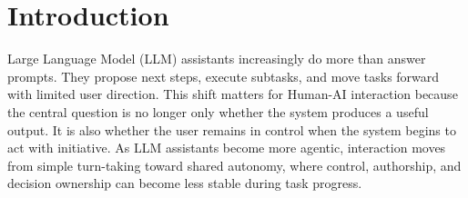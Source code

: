 \documentclass[sigconf,review,anonymous]{acmart}
\begin{document}



\maketitle

\section{Introduction}

Large Language Model (LLM) assistants increasingly do more than answer prompts. They propose next steps, execute subtasks, and move tasks forward with limited user direction. This shift matters for Human-AI interaction because the central question is no longer only whether the system produces a useful output. It is also whether the user remains in control when the system begins to act with initiative. As LLM assistants become more agentic, interaction moves from simple turn-taking toward shared autonomy, where control, authorship, and decision ownership can become less stable during task progress.
\end{document}
